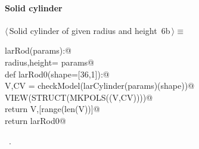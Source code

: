 \documentclass[11pt,oneside]{article}	%
\begin{document}
\paragraph{Solid cylinder}
\begin{flushleft} \small \label{scrap13}
\protect{}$\langle\,$Solid cylinder of given radius and height\nobreak\ {\footnotesize 6b}$\,\rangle\equiv$
\vspace{-1ex}
\begin{list}{}{} \item
\mbox{}\verb@def larRod(params):@\\
\mbox{}\verb@   radius,height= params@\\
\mbox{}\verb@   def larRod0(shape=[36,1]):@\\
\mbox{}\verb@      V,CV = checkModel(larCylinder(params)(shape))@\\
\mbox{}\verb@      VIEW(STRUCT(MKPOLS((V,CV))))@\\
\mbox{}\verb@      return V,[range(len(V))]@\\
\mbox{}\verb@   return larRod0@\\
\mbox{}\verb@@{\NWsep}
\end{list}
\vspace{-1ex}
\footnotesize\addtolength{\baselineskip}{-1ex}
\begin{list}{}{\setlength{\itemsep}{-\parsep}\setlength{\itemindent}{-\leftmargin}}
\item \NWtxtMacroRefIn\ .
\end{list}
\end{flushleft}
\end{document}
